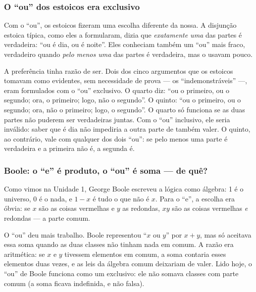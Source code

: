 \subsubsection{O \enquote{ou} dos estoicos era exclusivo}
Com o \enquote{ou}, os estoicos fizeram uma escolha diferente da nossa. A disjunção estoica típica, como eles a formularam, dizia que \emph{exatamente uma} das partes é verdadeira: \enquote{ou é dia, ou é noite}. Eles conheciam também um \enquote{ou} mais fraco, verdadeiro quando \emph{pelo menos uma} das partes é verdadeira, mas o usavam pouco.

A preferência tinha razão de ser. Dois dos cinco argumentos que os estoicos tomavam como evidentes, sem necessidade de prova — os \enquote{indemonstráveis} —, eram formulados com o \enquote{ou} exclusivo. O quarto diz: \enquote{ou o primeiro, ou o segundo; ora, o primeiro; logo, não o segundo}. O quinto: \enquote{ou o primeiro, ou o segundo; ora, não o primeiro; logo, o segundo}. O quarto só funciona se as duas partes não puderem ser verdadeiras juntas. Com o \enquote{ou} inclusivo, ele seria inválido: saber que é dia não impediria a outra parte de também valer. O quinto, ao contrário, vale com qualquer dos dois \enquote{ou}: se pelo menos uma parte é verdadeira e a primeira não é, a segunda é.

\subsubsection{Boole: o \enquote{e} é produto, o \enquote{ou} é soma — de quê?}
Como vimos na Unidade 1, George Boole escreveu a lógica como álgebra: 1 é o universo, 0 é o nada, e $1-x$ é tudo o que não é $x$. Para o \enquote{e}, a escolha era óbvia: se $x$ são as coisas vermelhas e $y$ as redondas, $xy$ são as coisas vermelhas \emph{e} redondas — a parte comum.

O \enquote{ou} deu mais trabalho. Boole representou \enquote{$x$ ou $y$} por $x+y$, mas só aceitava essa soma quando as duas classes não tinham nada em comum. A razão era aritmética: se $x$ e $y$ tivessem elementos em comum, a soma contaria esses elementos duas vezes, e as leis da álgebra comum deixariam de valer. Lido hoje, o \enquote{ou} de Boole funciona como um exclusivo: ele não somava classes com parte comum (a soma ficava indefinida, e não falsa).

